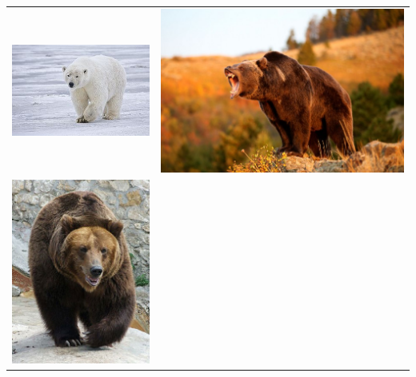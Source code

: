 \documentclass[12pt]{article}
\begin{document}
\begin{tabular}{ c c }
  \includegraphics[scale=0.5]{polar_bear.jpg} & %
  \includegraphics[scale=0.5]{grizzlybear-617x416.jpg} \\ %
  \includegraphics[scale=0.5]{brown_bear_1.jpg} & %

\end{tabular}
\end{document}
